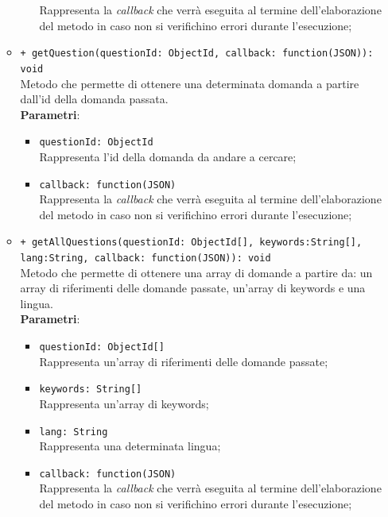 \begin{itemize}
\begin{itemize}
\begin{itemize}
			Rappresenta la \textit{callback} che verrà eseguita al termine dell'elaborazione del metodo in caso non si verifichino errori durante l'esecuzione;
		\end{itemize}
	\item \texttt{+ getQuestion(questionId: ObjectId, callback: function(JSON)): void} \\
	Metodo che permette di ottenere una determinata domanda a partire dall'id della domanda passata. \\
			\textbf{Parametri}:
			\begin{itemize}
				\item \texttt{questionId: ObjectId} \\
				Rappresenta l'id della domanda da andare a cercare;
				\item \texttt{callback: function(JSON)} \\
				Rappresenta la \textit{callback} che verrà eseguita al termine dell'elaborazione del metodo in caso non si verifichino errori durante l'esecuzione;
			\end{itemize}	
			
	\item \texttt{+ getAllQuestions(questionId: ObjectId[], keywords:String[], lang:String, callback: function(JSON)): void} \\
	Metodo che permette di ottenere una array di domande a partire da: un array di riferimenti delle domande passate, un'array di keywords e una lingua. \\
		\textbf{Parametri}:
		\begin{itemize}
			\item \texttt{questionId: ObjectId[]} \\
			Rappresenta un'array di riferimenti delle domande passate;
			\item \texttt{keywords: String[]} \\
			Rappresenta un'array di keywords;
			\item \texttt{lang: String} \\
			Rappresenta una determinata lingua;
			\item \texttt{callback: function(JSON)} \\
			Rappresenta la \textit{callback} che verrà eseguita al termine dell'elaborazione del metodo in caso non si verifichino errori durante l'esecuzione;
		\end{itemize}	
		

\end{itemize}
\end{itemize}

